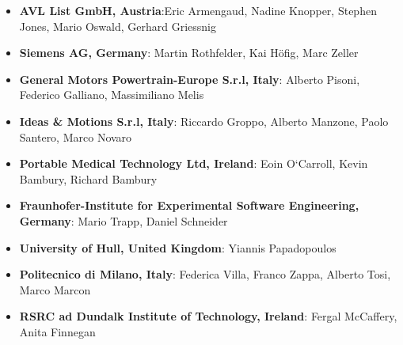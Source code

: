 \documentclass[runningheads,a4paper]{llncs}
\begin{document}
\begin{itemize}
	\item \textbf{AVL List GmbH, Austria}:Eric Armengaud, Nadine Knopper, Stephen Jones, Mario Oswald, Gerhard Griessnig 
	\item \textbf{Siemens AG, Germany}: Martin Rothfelder, Kai H{\"o}fig, Marc Zeller
	\item \textbf{General Motors Powertrain-Europe S.r.l, Italy}: Alberto Pisoni, Federico Galliano, Massimiliano Melis
	\item \textbf{Ideas \& Motions S.r.l, Italy}: Riccardo Groppo, Alberto Manzone, Paolo Santero, Marco Novaro
	\item \textbf{Portable Medical Technology Ltd, Ireland}: Eoin O`Carroll, Kevin Bambury, Richard Bambury
	\item \textbf{Fraunhofer-Institute for Experimental Software Engineering, Germany}: Mario Trapp, Daniel Schneider
	\item \textbf{University of Hull, United Kingdom}: Yiannis Papadopoulos
	\item \textbf{Politecnico di Milano, Italy}: Federica Villa, Franco Zappa, Alberto Tosi, Marco Marcon
	\item \textbf{RSRC ad Dundalk Institute of Technology, Ireland}: Fergal McCaffery, Anita Finnegan
\end{itemize}











 
  
\end{document}
